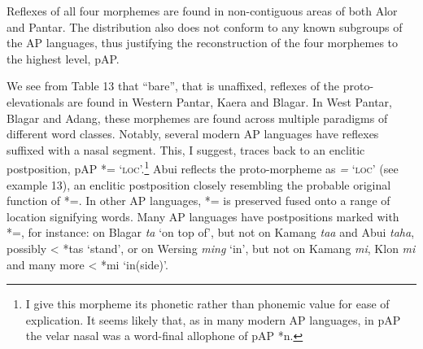 Reflexes of all four morphemes are found in non-contiguous areas of both Alor and Pantar. The distribution also does not conform to any known subgroups of the AP languages, thus justifying the reconstruction of the four morphemes to the highest level, pAP.

 We see from Table 13 that ``bare'', that is unaffixed, reflexes of the proto-elevationals are found in Western Pantar, Kaera and Blagar. In West Pantar, Blagar and  Adang, these morphemes are found across multiple paradigms of different word classes. Notably, several modern AP languages have reflexes suffixed with a nasal segment. This, I suggest, traces back to an enclitic postposition, pAP *={\ng} `\textsc{loc}'.\footnote{{}  I give this morpheme its phonetic rather than phonemic value for ease of explication. It seems likely that, as in many modern AP languages, in pAP the velar nasal was a word-final allophone of pAP *n.}  Abui reflects the proto-morpheme as \textit{=}\textit{{\ng}} `\textsc{loc}' (see example 13), an enclitic postposition closely resembling the probable original function of *={\ng}. In other AP languages, *={\ng} is preserved fused onto a range of location signifying words. Many AP languages have postpositions marked with *={\ng}, for instance: on Blagar \textit{ta}\textit{{\ng}} `on top of', but not on Kamang \textit{taa} and Abui \textit{taha}, possibly {\textless} *tas `stand', or on Wersing \textit{ming} `in', but not on Kamang \textit{mi}, Klon \textit{mi} and many more {\textless} *mi `in(side)'. 

